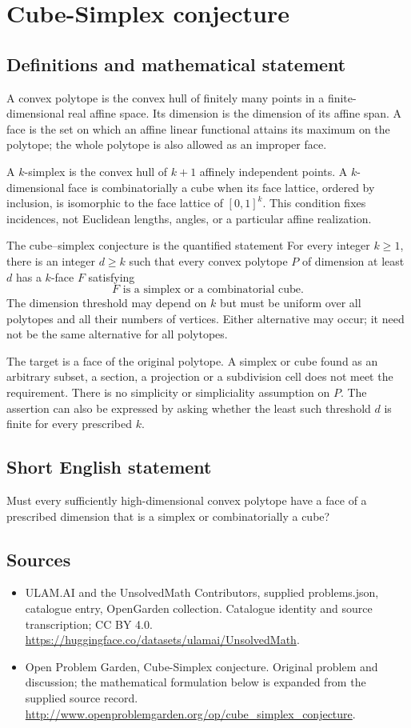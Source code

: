 \documentclass[11pt,a4paper]{article}
\begin{document}
\section*{Cube-Simplex conjecture}\label{statement}

\subsection{Definitions and mathematical statement}
A convex polytope is the convex hull of finitely many points in a
finite-dimensional real affine space. Its dimension is the dimension of
its affine span. A face is the set on which an affine linear functional
attains its maximum on the polytope; the whole polytope is also allowed
as an improper face.

A $k$-simplex is the convex hull of $k+1$ affinely independent points.
A $k$-dimensional face is combinatorially a cube when its face lattice,
ordered by inclusion, is isomorphic to the face lattice of $[0,1]^k$.
This condition fixes incidences, not Euclidean lengths, angles, or a
particular affine realization.

The cube--simplex conjecture is the quantified statement
For every integer $k\ge1$, there is an integer $d\ge k$ such that
 every convex polytope $P$ of dimension at least $d$ has a $k$-face $F$
 satisfying
\[
       F\text{ is a simplex or a combinatorial cube}.
\]
The dimension threshold may depend on $k$ but must be uniform over all
polytopes and all their numbers of vertices. Either alternative may occur;
it need not be the same alternative for all polytopes.

The target is a face of the original polytope. A simplex or cube found
as an arbitrary subset, a section, a projection or a subdivision cell
does not meet the requirement. There is no simplicity or simpliciality
assumption on $P$. The assertion can also be expressed by asking whether
the least such threshold $d$ is finite for every prescribed $k$.
\subsection{Short English statement}
Must every sufficiently high-dimensional convex polytope have a face of a prescribed dimension that is a simplex or combinatorially a cube?
\subsection{Sources}
\begin{itemize}
\item[S1] ULAM.AI and the UnsolvedMath Contributors, supplied problems.json, catalogue entry, OpenGarden collection. Catalogue identity and source transcription; CC BY 4.0.
\url{https://huggingface.co/datasets/ulamai/UnsolvedMath}.
\item[S2] Open Problem Garden, Cube-Simplex conjecture. Original problem and discussion; the mathematical formulation below is expanded from the supplied source record.
\url{http://www.openproblemgarden.org/op/cube_simplex_conjecture}.
\end{itemize}
\end{document}

